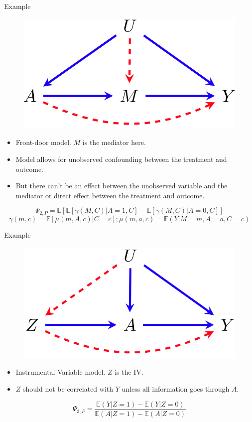 \documentclass{beamer}
\begin{document}
\begin{frame}{Example}
	\begin{figure}
		\center
		\includegraphics[scale=0.2]{m2.png}
	\end{figure}
	\begin{itemize}
		\item Front-door model. $ M $ is the mediator here.
		\item Model allows for unobserved confounding between the treatment and outcome.
		\item But there can't be an effect between the unobserved variable and the mediator or direct effect between the treatment and outcome.
	\end{itemize}
	$$ \Psi_{2, P} = \mathbb{E}[\mathbb{E}[\gamma(M, C) | A = 1, C] - \mathbb{E}[\gamma(M, C) | A =0, C]] $$
	$$ \gamma(m, c) = \mathbb{E}[\mu(m, A, c) | C=c]; \mu(m, a, c) = \mathbb{E}(Y | M=m, A=a, C=c) $$
\end{frame}

\begin{frame}{Example}
	\begin{figure}
		\center
		\includegraphics[scale=0.2]{m3.png}
	\end{figure}
	\begin{itemize}
		\item Instrumental Variable model. $ Z $ is the IV.
		\item $ Z $ should not be correlated with $ Y $ unless all information goes through $ A $.
	\end{itemize}
	$$ \Psi_{3, P} = \frac{\mathbb{E}(Y | Z = 1) - \mathbb{E}(Y | Z = 0)}{\mathbb{E}(A | Z = 1) - \mathbb{E}(A | Z=0)} $$
\end{frame}
\end{document}
